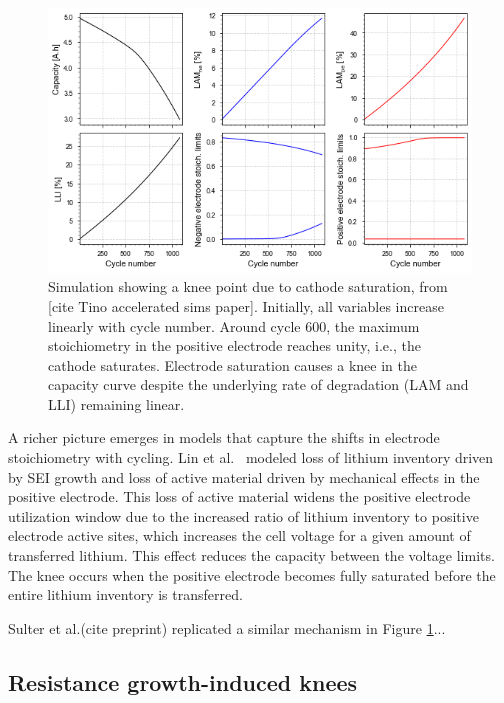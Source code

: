 \documentclass[journal=jpclcd,manuscript=article]{achemso}
\begin{document}
\begin{figure}
    \centering
    \includegraphics[width=\linewidth]{figures/stoich_knee.png}
    \caption{Simulation showing a knee point due to cathode saturation, from [cite Tino accelerated sims paper]. Initially, all variables increase linearly with cycle number. Around cycle 600, the maximum stoichiometry in the positive electrode reaches unity, i.e., the cathode saturates. Electrode saturation causes a knee in the capacity curve despite the underlying rate of degradation (LAM and LLI) remaining linear.}
    \label{fig:electrode_sat_simulation}
\end{figure}

A richer picture emerges in models that capture the shifts in electrode stoichiometry with cycling. Lin et al.~\cite{lin_comprehensive_2013} modeled loss of lithium inventory driven by SEI growth and loss of active material driven by mechanical effects in the positive electrode. This loss of active material widens the positive electrode utilization window due to the increased ratio of lithium inventory to positive electrode active sites, which increases the cell voltage for a given amount of transferred lithium. This effect reduces the capacity between the voltage limits. The knee occurs when the positive electrode becomes fully saturated before the entire lithium inventory is transferred.

Sulter et al.(cite preprint) replicated a similar mechanism in Figure \ref{fig:electrode_sat_simulation}...

\subsection{Resistance growth-induced knees}
\end{document}
